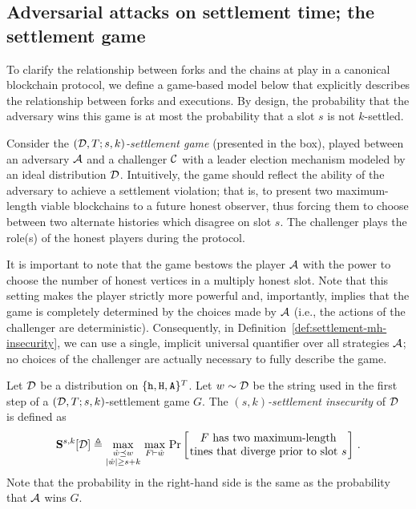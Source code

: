 \subsection{Adversarial attacks on settlement time; the settlement game}\label{sec:game-mh} 


  To clarify the relationship between forks and the chains at play in a
  canonical blockchain protocol, we define a game-based model below that
  explicitly describes the relationship between forks and executions.
  By design, the probability that the adversary wins this game is at
  most the probability that a slot $s$ is not $k$-settled. 

  Consider the \emph{$(\mathcal{D},T;s,k)$-settlement game} 
  (presented in the box), played
  between an adversary $\mathcal{A}$ and a challenger $\mathcal{C}$ with
  a leader election mechanism modeled by an ideal distribution
  $\mathcal{D}$. Intuitively, the game should reflect the ability of
  the adversary to achieve a settlement violation; that is, to present
  two maximum-length viable blockchains to a future honest observer,
  thus forcing them to choose between two alternate histories which
  disagree on slot $s$.
  The challenger plays the role(s) of the honest players during the
  protocol. 

  It is important to note that the game bestows the player $\mathcal{A}$ 
  with the power to choose the number of honest vertices in 
  a multiply honest slot. 
  Note that this setting makes the player strictly more powerful and, 
  importantly, implies that 
  the game is completely determined 
  by the choices made by $\mathcal{A}$ 
  (i.e., the actions of the challenger are deterministic). 
  Consequently, in Definition~\ref{def:settlement-mh-insecurity}, 
  we can use a single, implicit universal quantifier 
  over all strategies $\mathcal{A}$; no choices of the challenger are actually necessary to fully describe the game.


  \begin{definition}\label{def:settlement-mh-insecurity}
    Let $\mathcal{D}$ be a distribution on $\{\mathtt{h}, \mathtt{H}, \mathtt{A}\}^T$. 
    Let $w \sim \mathcal{D}$ be the string used in the 
    first step of a $(\mathcal{D}, T; s, k)$-settlement game $G$. 
    The \emph{$(s,k)$-settlement insecurity} of $\mathcal{D}$ 
    is defined as 
    \[
      \mathbf{S}^{s,k}[\Distribution] \triangleq 
        \max_{\substack{\hat{w} \PrefixEq w \\ |\hat{w}| \geq s + k}}\,
        \max_{F \Fork \hat{w}}\, 
        \Pr\left[\parbox{50mm}{\centering $F$ has two maximum-length tines that diverge prior to slot $s$}\right]
      \,.
    \]
    Note that the probability in the right-hand side is the same as 
    the probability that $\mathcal{A}$ wins $G$.
  \end{definition}

